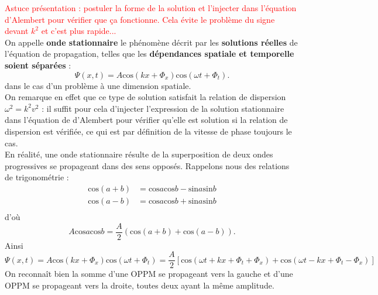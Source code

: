 \documentclass[11pt,a4paper]{report}
\begin{document}
\textcolor{red}{Astuce présentation : postuler la forme de la solution et l'injecter dans l'équation d'Alembert pour vérifier que ça fonctionne. Cela évite le problème du signe devant $k^2$ et c'est plus rapide...}\\

On appelle \textbf{onde stationnaire} le phénomène décrit par les \textbf{solutions réelles} de l'équation de propagation, telles que les \textbf{dépendances spatiale et temporelle soient séparées} :
\begin{equation}
	\Psi(x,t) = A  \text{cos}(kx + \Phi_x)\text{cos}(\omega t + \Phi_t).
\end{equation}
dans le cas d'un problème à une dimension spatiale.\\

On remarque en effet que ce type de solution satisfait la relation de dispersion $\omega^2 = k^2v^2$ : il suffit pour cela d'injecter l'expression de la solution stationnaire dans l'équation de d'Alembert pour vérifier qu'elle est solution si la relation de dispersion est vérifiée, ce qui est par définition de la vitesse de phase toujours le cas.\\

En réalité, une onde stationnaire résulte de la superposition de deux ondes progressives se propageant dans des sens opposés. Rappelons nous des relations de trigonométrie :
\begin{align*}
	\text{cos}(a+b) &= \text{cos}a\text{cos}b - \text{sin}a\text{sin}b\\
	\text{cos}(a-b) &= \text{cos}a\text{cos}b + \text{sin}a\text{sin}b\\
\end{align*}
d'où
\begin{equation}
	A\text{cos}a\text{cos}b = \frac{A}{2}\left(\text{cos}(a+b) + \text{cos}(a-b)\right).
\end{equation}
Ainsi
\begin{equation}
	\Psi(x,t) = A  \text{cos}(kx + \Phi_x)\text{cos}(\omega t + \Phi_t) = \frac{A}{2}\left[\text{cos}(\omega t + kx + \Phi_t + \Phi_x) + \text{cos}(\omega t -kx + \Phi_t - \Phi_x) \right]
\end{equation}
On reconnaît bien la somme d'une OPPM se propageant vers la gauche et d'une OPPM se propageant vers la droite, toutes deux ayant la même amplitude.\\
\end{document}
